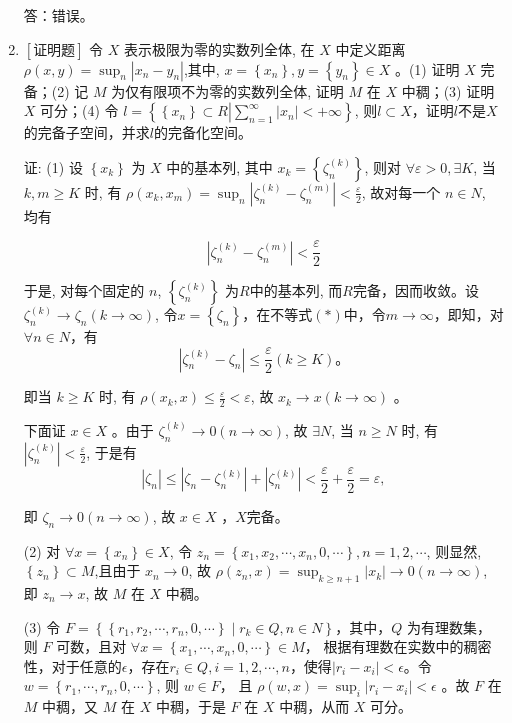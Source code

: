 \documentclass{article}
\begin{document}
\begin{enumerate}
    答：错误。
    
    \item $\left[\textbf{证明题}\right]$ 令 $X$ 表示极限为零的实数列全体, 在 $X$ 中定义距离 $\rho(x, y)=\sup _n\left|x_n-y_n\right|$,其中, $x=\left\{x_n\right\}, y=\left\{y_n\right\} \in X$ 。(1) 证明 $X$ 完备；(2) 记 $M$ 为仅有限项不为零的实数列全体, 证明 $M$ 在 $X$ 中稠；(3) 证明 $X$ 可分；(4) 令 $l=\left\{\left\{x_n\right\} \subset R\left|\sum_{n=1}^{\infty}\left| x_n \right| <+\infty \right.\right\}$, 则$l\subset X$，证明$l$不是$X$的完备子空间，并求$l$的完备化空间。
    
证: (1) 设 $\left\{x_k\right\}$ 为 $X$ 中的基本列, 其中 $x_k=\left\{\zeta_n^{(k)}\right\}$, 则对 $\forall \varepsilon>0, \exists K$, 当 $k, m \geq K$ 时, 有 $\rho\left(x_k, x_m\right)=\sup _n\left|\zeta_n^{(k)}-\zeta_n^{(m)}\right|<\frac{\varepsilon}{2}$, 故对每一个 $n \in N$, 均有

\begin{equation*}
\left|\zeta_n^{(k)}-\zeta_n^{(m)}\right|<\frac{\varepsilon}{2} \tag{*}
\end{equation*}

于是, 对每个固定的 $n$, $\left\{\zeta_n^{(k)}\right\}$ 为$R$中的基本列, 而$R$完备，因而收敛。设 $\zeta_n^{(k)} \rightarrow \zeta_n(k \rightarrow \infty)$, 令$x=\left\{\zeta_n\right\}$，在不等式$(*)$中，令$m\to \infty$，即知，对$\forall n\in N$，有
$$
\left|\zeta_n^{(k)}-\zeta_n\right| \leq \frac{\varepsilon}{2}(k \geq K) 。
$$

即当 $k \geq K$ 时, 有 $\rho\left(x_k, x\right) \leq \frac{\varepsilon}{2}<\varepsilon$, 故 $x_k \rightarrow x(k \rightarrow \infty)$ 。

下面证 $x \in X$ 。由于 $\zeta_n^{(k)} \rightarrow 0(n \rightarrow \infty)$, 故 $\exists N$, 当 $n \geq N$ 时, 有 $\left|\zeta_n^{(k)}\right|<\frac{\varepsilon}{2}$, 于是有
$$
\left|\zeta_n\right| \leq\left|\zeta_n-\zeta_n^{(k)}\right|+\left|\zeta_n^{(k)}\right|<\frac{\varepsilon}{2}+\frac{\varepsilon}{2}=\varepsilon,
$$

即 $\zeta_n \rightarrow 0(n \rightarrow \infty)$, 故 $x \in X$ ，$X$完备。

(2) 对 $\forall x=\left\{x_n\right\} \in X$, 令 $z_n=\left\{x_1, x_2, \cdots, x_n, 0, \cdots\right\}, n=1,2, \cdots$, 则显然, $\left\{z_n\right\} \subset M$,且由于 $x_n \rightarrow 0$, 故 $\rho\left(z_n, x\right)=\sup _{k \geq n+1}\left|x_k\right| \rightarrow 0(n \rightarrow \infty)$, 即 $z_n \rightarrow x$, 故 $M$ 在 $X$ 中稠。

(3) 令 $F=\left\{\left\{r_1, r_2, \cdots, r_n, 0, \cdots\right\} \mid r_k \in Q, n \in N\right\}$，其中，$Q$ 为有理数集，则 $F$ 可数，且对 $\forall x=\left\{x_1, \cdots, x_n, 0, \cdots\right\} \in M$， 根据有理数在实数中的稠密性，对于任意的$\epsilon$，存在$r_i \in Q, i=1,2, \cdots, n$，使得$\left|r_i - x_i\right| < \epsilon$。令 $w=\left\{r_{1}, \cdots, r_{n}, 0, \cdots\right\}$, 则 $w \in F$， 且 $\rho\left(w, x\right)=\sup _i\left|r_{i}-x_i\right| < \epsilon$ 。故 $F$ 在 $M$ 中稠，又 $M$ 在 $X$ 中稠，于是 $F$ 在 $X$ 中稠，从而 $X$ 可分。



\end{enumerate}
\end{document}
